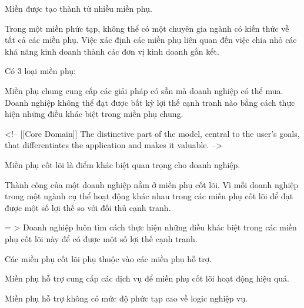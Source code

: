 
Miền được tạo thành từ nhiều miền phụ.


Trong một miền phức tạp, không thể có một chuyên gia ngành có kiến thức về tất cả các miền phụ.
Việc xác định các miền phụ liên quan đến việc chia nhỏ các khả năng kinh doanh thành các đơn vị kinh doanh gắn kết.


Có 3 loại miền phụ:


Miền phụ chung cung cấp các giải pháp có sẵn mà doanh nghiệp có thể mua.
Doanh nghiệp không thể đạt được bất kỳ lợi thế cạnh tranh nào bằng cách thực hiện những điều khác biệt trong miền phụ chung.


<!-- [[Core Domain]] The distinctive part of the model, central to the user’s goals, that differentiates the application and makes it valuable. -->

Miền phụ cốt lõi là điểm khác biệt quan trọng cho doanh nghiệp.

Thành công của một doanh nghiệp nằm ở miền phụ cốt lõi. Vì mỗi doanh nghiệp trong một ngành cụ thể hoạt động khác nhau trong các miền phụ cốt lõi để đạt được một số lợi thế so với đối thủ cạnh tranh.

= > Doanh nghiệp luôn tìm cách thực hiện những điều khác biệt trong các miền phụ cốt lõi này để có được một số lợi thế cạnh tranh.



Các miền phụ cốt lõi phụ thuộc vào các miền phụ hỗ trợ.

Miền phụ hỗ trợ cung cấp các dịch vụ để miền phụ cốt lõi hoạt động hiệu quả.

Miền phụ hỗ trợ không có mức độ phức tạp cao về logic nghiệp vụ.



